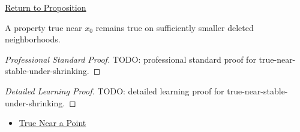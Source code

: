 \newpage
{}
\label{prf:true-near-stable-under-shrinking}

\begin{remark*}[Return]
\hyperref[prop:true-near-stable-under-shrinking]{Return to Proposition}
\end{remark*}

\begin{proposition*}
A property true near \(x_0\) remains true on sufficiently smaller deleted neighborhoods.
\end{proposition*}

\begin{proof}[Professional Standard Proof]
\LRAProofBodyStart
TODO: professional standard proof for true-near-stable-under-shrinking.
\end{proof}

\begin{proof}[Detailed Learning Proof]
\LRAProofBodyStart
TODO: detailed learning proof for true-near-stable-under-shrinking.
\end{proof}

\begin{remark*}
\end{remark*}

\begin{dependencies}
\begin{itemize}
  \item \hyperref[def:true-near]{True Near a Point}
\end{itemize}
\end{dependencies}

\clearpage
